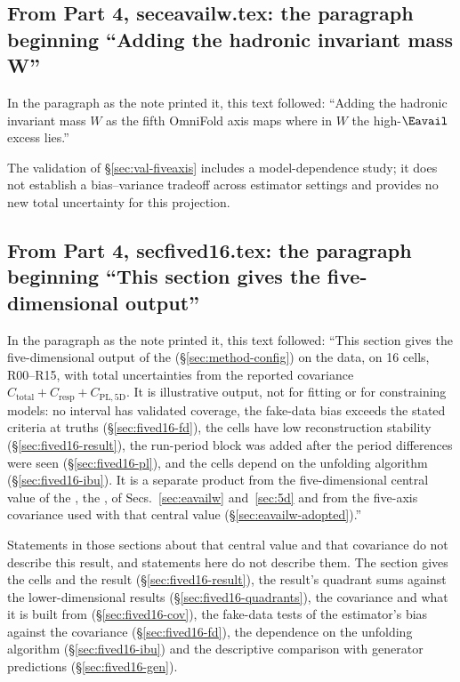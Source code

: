 \subsection{From Part 4, seceavailw.tex: the paragraph beginning ``Adding the hadronic invariant mass W''}
In the paragraph as the note printed it, this text followed: ``Adding the hadronic invariant mass $W$ as the fifth OmniFold axis maps where in $W$ the high-$\Eavail$ excess lies.''\par
The validation of \S\ref{sec:val-fiveaxis} includes a model-dependence study; it does not establish a bias--variance tradeoff across estimator settings and provides no new total uncertainty for this projection.

\subsection{From Part 4, secfived16.tex: the paragraph beginning ``This section gives the five-dimensional output''}
In the paragraph as the note printed it, this text followed: ``This section gives the five-dimensional output of the \estMultiD{} (\S\ref{sec:method-config}) on the data, on 16 cells, R00--R15, with total uncertainties from the reported covariance $C_{\mathrm{total}}+C_{\mathrm{resp}}+C_{\mathrm{PL,5D}}$. It is illustrative output, not for fitting or for constraining models: no interval has validated coverage, the fake-data bias exceeds the stated criteria at  truths (\S\ref{sec:fived16-fd}), the cells  have low reconstruction stability (\S\ref{sec:fived16-result}), the run-period block was added after the period differences were seen (\S\ref{sec:fived16-pl}), and the cells depend on the unfolding algorithm (\S\ref{sec:fived16-ibu}). It is a separate product from the five-dimensional central value of the \estPurity{}, the \resFiveAxis{}, of Secs.~\ref{sec:eavailw} and~\ref{sec:5d} and from the five-axis covariance used with that central value (\S\ref{sec:eavailw-adopted}).''\par
Statements in those sections about that central value and that covariance do not describe this result, and statements here do not describe them. The section gives the cells and the result (\S\ref{sec:fived16-result}), the result's quadrant sums against the lower-dimensional results (\S\ref{sec:fived16-quadrants}), the covariance and what it is built from (\S\ref{sec:fived16-cov}), the fake-data tests of the estimator's bias against the covariance (\S\ref{sec:fived16-fd}), the dependence on the unfolding algorithm (\S\ref{sec:fived16-ibu}) and the descriptive comparison with generator predictions (\S\ref{sec:fived16-gen}).


